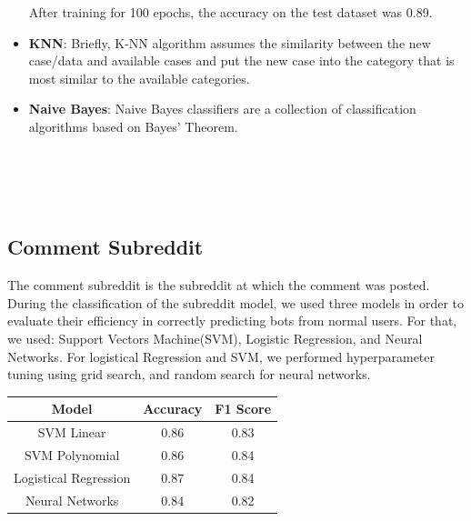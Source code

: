 \documentclass{article}
\begin{document}
\begin{itemize}
    After training for 100 epochs, the accuracy on the test dataset was 0.89.

        \item \textbf{KNN}: Briefly, K-NN algorithm assumes the similarity between the new case/data and available cases and put the new case into the category that is most similar to the available categories.

        \item \textbf{Naive Bayes}:     Naive Bayes classifiers are a collection of classification algorithms based on Bayes’ Theorem.
\\ \\ \\ \\ \\
        \end{itemize} 
        

    \subsection{Comment Subreddit}
    The comment subreddit is the subreddit at which the comment was posted. \\
    During the classification of  the subreddit model, we used three models in order to evaluate their efficiency in correctly predicting bots from normal users. For that, we used: Support Vectors Machine(SVM), Logistic Regression, and Neural Networks.
    For logistical Regression and SVM, we performed hyperparameter tuning using grid search, and random search for neural networks.
 
        \begin{center}
    \begin{tabular}{|c || c| c|} 
     \hline
     Model & Accuracy  & F1 Score  \\ [0.5ex] 
     \hline\hline
     SVM Linear & 0.86  &0.83 \\ 
     \hline
     SVM Polynomial & 0.86 &0.84 \\
     \hline
     Logistical Regression & 0.87 & 0.84  \\ 
     \hline
     Neural Networks & 0.84  & 0.82\\
     \hline

    \end{tabular}
    \end{center}
\end{document}
